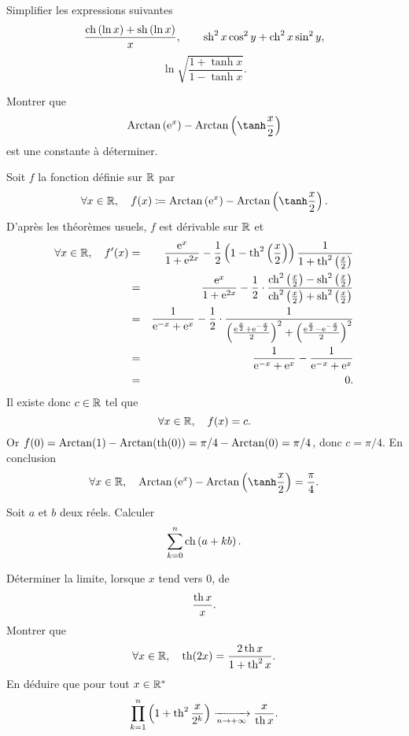 \documentclass{magnolia}
\begin{document}
Simplifier les expressions suivantes
\[\frac{\operatorname{ch}\left(\ln x\right)+\operatorname{sh}\left(\ln x\right)}{x}, \qquad \operatorname{sh}^2x\cos^2y+\operatorname{ch}^2x\sin^2y,\]
\[\ln\sqrt{\frac{1+\tanh x}{1-\tanh x}}.\]

Montrer que
\[\arctan\p{\e^x}-\arctan\p{\tanh\frac{x}{2}}\]
est une constante à déterminer.
\begin{sol}
Soit $f$ la fonction définie sur $\mathbb{R}$ par
\[\forall x\in\R\qsep f(x)\defeq \arctan\p{\e^x}-\arctan\p{\tanh\frac{x}{2}}.\]
D'après les théorèmes usuels, $f$ est dérivable sur $\mathbb{R}$ et
\begin{eqnarray*}
\forall x\in\mathbb{R},\quad f'(x)
&=& \frac{{\rm e}^x}{1+{\rm e}^{2x}}-\frac{1}{2}\left(1-\operatorname{th}^2\left(\frac{x}{2}\right)\right)\frac{1}{1+\operatorname{th}^2\left(\frac{x}{2}\right)}\\
&=& \frac{{\rm e}^x}{1+{\rm e}^{2x}}-\frac{1}{2}\cdot\frac{\operatorname{ch}^2\left(\frac{x}{2}\right)-\operatorname{sh}^2\left(\frac{x}{2}\right)}{\operatorname{ch}^2\left(\frac{x}{2}\right)+\operatorname{sh}^2\left(\frac{x}{2}\right)}\\
&=& \frac{1}{{\rm e}^{-x}+{\rm e}^{x}}-\frac{1}{2}\cdot\frac{1}{\left(\frac{{\rm e}^{\frac{x}{2}}+{\rm e}^{-\frac{x}{2}}}{2}\right)^2+\left(\frac{{\rm e}^{\frac{x}{2}}-{\rm e}^{-\frac{x}{2}}}{2}\right)^2}\\
&=& \frac{1}{{\rm e}^{-x}+{\rm e}^{x}} - \frac{1}{{\rm e}^{-x}+{\rm e}^{x}}\\
&=& 0.
\end{eqnarray*}
Il existe donc $c\in\mathbb{R}$ tel que
\[\forall x\in\mathbb{R},\quad f(x)=c.\]
Or $f(0)=\operatorname{Arctan}(1)-\operatorname{Arctan}(\operatorname{th}(0))=\pi/4-\operatorname{Arctan}(0)=\pi/4$, donc $c=\pi/4$. En conclusion 
\[\forall x\in\R\qsep \arctan\p{\e^x}-\arctan\p{\tanh\frac{x}{2}}=\frac{\pi}{4}.\]
\end{sol}

Soit $a$ et $b$ deux réels. Calculer
$$\sum_{k=0}^n \operatorname{ch}\left(a+kb\right).$$

\begin{questions}
\question Déterminer la limite, lorsque $x$ tend vers 0, de
  \[\frac{\operatorname{th} x}{x}.\]
\question Montrer que
  \[\forall x\in\mathbb{R},\quad \operatorname{th}(2x)=\frac{2\operatorname{th} x}{1+\operatorname{th}^2 x}.\]
\question En déduire que pour tout $x\in{\mathbb{R}^*}$
  \[\prod_{k=1}^n \left(1+\operatorname{th}^2 \frac{x}{2^k}\right)\xrightarrow[n\rightarrow +\infty]{}\frac{x}{\operatorname{th} x}.\]
\end{questions}
\end{document}
